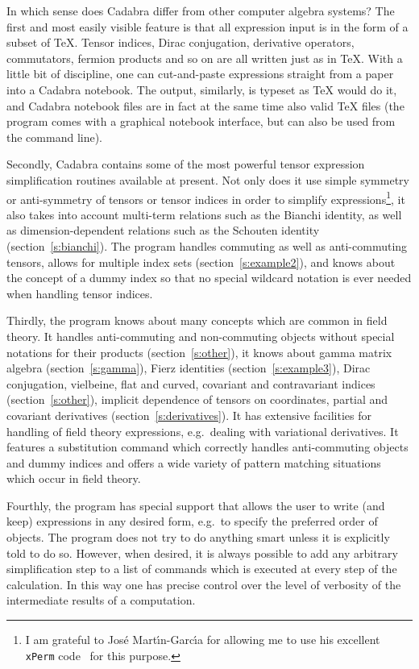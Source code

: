 \documentclass[11pt]{article}
\newcommand{\Cdb}{{Cadabra}\xspace}
\begin{document}
\medskip

In which sense does \Cdb differ from other computer algebra systems?
The first and most easily visible feature is that all expression input is in
the form of a subset of \TeX. Tensor indices, Dirac conjugation,
derivative operators, commutators, fermion products and so on are all
written just as in \TeX.  With a little bit of discipline, one can
cut-and-paste expressions straight from a paper into a \Cdb
notebook. The output, similarly, is typeset as \TeX{} would do it, and
\Cdb notebook files are in fact at the same time also valid \TeX{}
files (the program comes with a graphical notebook interface, but can
also be used from the command line).

Secondly, \Cdb contains some of the most powerful tensor expression
simplification routines available at present. Not only does it use
simple symmetry or anti-symmetry of tensors or tensor indices in order
to simplify expressions\footnote{I am grateful to Jos\'e
Mart\'\i{}n-Garc\'\i{}a for allowing me to use his excellent {\tt
xPerm} code~\cite{e_xact} for this purpose.}, it also takes into
account multi-term relations such as the Bianchi identity, as well as
dimension-dependent relations such as the Schouten identity
(section~\ref{s:bianchi}). The program handles commuting as well as
anti-commuting tensors, allows for multiple index sets
(section~\ref{s:example2}), and knows about the concept of a dummy
index so that no special wildcard notation is ever needed when
handling tensor indices.

Thirdly, the program knows about many concepts which are common in
field theory. It handles anti-commuting and non-commuting objects
without special notations for their products (section~\ref{s:other}),
it knows about gamma matrix algebra (section~\ref{s:gamma}), Fierz
identities (section~\ref{s:example3}), Dirac conjugation, vielbeine,
flat and curved, covariant and contravariant indices
(section~\ref{s:other}), implicit dependence of tensors on
coordinates, partial and covariant derivatives
(section~\ref{s:derivatives}). It has extensive facilities for handling
of field theory expressions, e.g.~dealing with variational
derivatives. It features a substitution command which correctly
handles anti-commuting objects and dummy indices and offers a wide
variety of pattern matching situations which occur in field theory.

Fourthly, the program has special support that allows the user to
write (and keep) expressions in any desired form, e.g.~to specify the
preferred order of objects. The program does not try to do anything
smart unless it is explicitly told to do so. However, when desired, it
is always possible to add any arbitrary simplification step to a list
of commands which is executed at every step of the calculation.  In
this way one has precise control over the level of verbosity of
the intermediate results of a computation.
\end{document}
